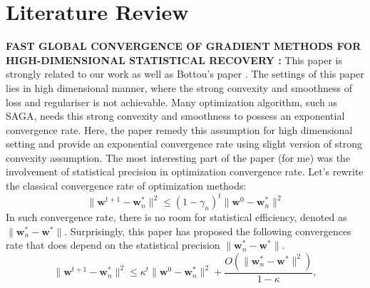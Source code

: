 \documentclass[11pt, a4paper, reqno, twoside]{scrartcl}
\theoremstyle{style}
\newcommand{\wv}{\bm{w}}
\newcommand{\0}{\mathbf{0}} %
\begin{document}
\section*{Literature Review}
\textbf{FAST GLOBAL CONVERGENCE OF GRADIENT METHODS FOR
HIGH-DIMENSIONAL STATISTICAL RECOVERY \cite{agarwal2010fast}:}
This paper is strongly related to our work as well as Bottou's paper
\cite{bousquet2008tradeoffs}. The settings of this paper lies in high
dimensional manner, where the strong convexity and smoothness of loss and
regulariser is not achievable. Many optimization algorithm, such as SAGA, needs
this strong convexity and smoothness to possess an exponential convergence rate.
Here, the paper remedy this assumption for high dimensional setting and provide
an exponential convergence rate using slight version of strong convexity
assumption. The most interesting part of the paper (for me) was the involvement
of statistical precision in optimization convergence rate. Let's rewrite the
classical convergence rate of optimization methods: 
\begin{equation}
	\| \wv^{t+1} - \wv_n^* \|^2 \leq (1-\gamma_n)^t \| \wv^0 - \wv_n^* \|^2 
\end{equation}
In such convergence rate, there is no room for statistical efficiency, denoted
as $\| \wv_n^* - \wv^* \|$. Surprisingly, this paper has proposed the following
convergences rate that does depend on the statistical precision $\| \wv_n^* -
\wv^* \|$. 
\begin{equation}
	\| \wv^{t+1} - \wv_n^* \|^2 \leq \kappa^t \| \wv^0 - \wv_n^* \|^2 +
	\frac{O(\| \wv_n^* - \wv^* \|^2)}{1-\kappa},
\end{equation}
\end{document}
